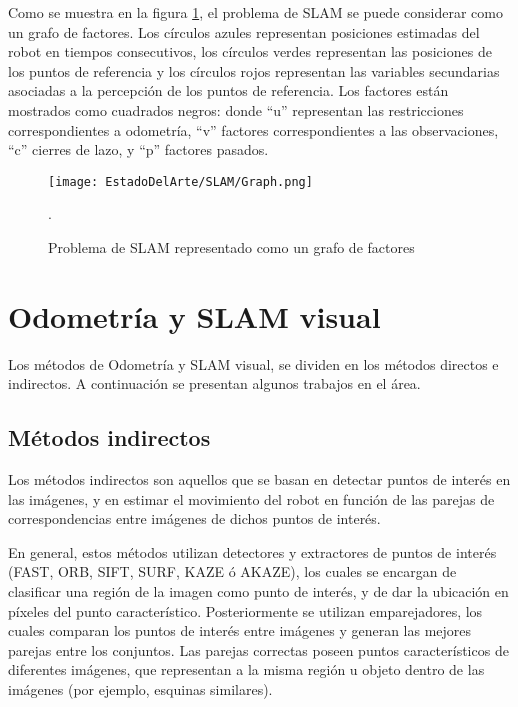 Como se muestra en la figura \ref{fig:SLAMGraph}, el problema de SLAM se puede considerar como un grafo de factores. Los círculos azules representan posiciones estimadas del robot en tiempos consecutivos, los círculos verdes representan las posiciones de los puntos de referencia y los círculos rojos representan las variables secundarias asociadas a la percepción de los puntos de referencia. Los factores están mostrados como cuadrados negros: donde  “u” representan las restricciones correspondientes a odometría, “v” factores correspondientes a las observaciones, “c” cierres de lazo, y “p” factores pasados.




\begin{figure}[H]
	\centering
	\texttt{[image: EstadoDelArte/SLAM/Graph.png]}
	\caption{Problema de SLAM representado como un grafo de factores \cite{Cadena}}.
    \label{fig:SLAMGraph}
\end{figure}



\section{Odometría  y SLAM visual}

Los métodos de Odometría y SLAM visual, se dividen en los métodos directos e indirectos. A continuación se presentan algunos trabajos en el área.

\subsection{Métodos indirectos}

Los métodos indirectos son aquellos que se basan en detectar puntos de interés en las imágenes, y en estimar el movimiento del robot en función de las parejas de correspondencias entre imágenes de dichos puntos de interés.

En general, estos métodos utilizan detectores y extractores de puntos de interés (FAST, ORB, SIFT, SURF, KAZE ó AKAZE), los cuales se encargan de clasificar una región de la imagen como punto de interés, y de dar la ubicación en píxeles del punto característico. Posteriormente se utilizan emparejadores, los cuales comparan los puntos de interés entre imágenes y generan las mejores parejas entre los conjuntos. Las parejas correctas poseen puntos característicos de diferentes imágenes, que representan a la misma región u objeto dentro de las imágenes (por ejemplo, esquinas similares). 

